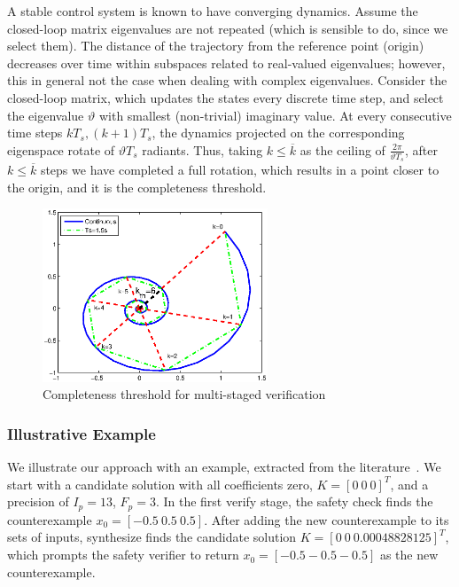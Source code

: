 \documentclass[runningheads,a4paper]{llncs}
\begin{document}
\begin{enumerate}
A stable control system is known to have converging dynamics.  Assume the
closed-loop matrix eigenvalues are not repeated (which is sensible to do,
since we select them).  The distance of the trajectory from the reference
point (origin) decreases over time within subspaces related to real-valued
eigenvalues; however, this in general not the case when dealing with complex
eigenvalues.  Consider the closed-loop matrix, which updates the states
every discrete time step, and select the eigenvalue $\vartheta$ with
smallest (non-trivial) imaginary value.  At every consecutive time steps
$kT_s, (k+1)T_s$, the dynamics projected on the corresponding eigenspace
rotate of $\vartheta T_s$ radiants.  Thus, taking $k{\leq}\overline{k}$ as the
ceiling of $\frac{2\pi}{\vartheta T_s}$, after $k{\leq}\overline{k}$ steps
we have completed a full rotation, which results in a point closer to the
origin, and it is the completeness threshold.

\begin{figure}[t]
\centering
\includegraphics[width=0.6\textwidth]{ct.eps}
\vspace{0.1cm}
\caption{Completeness threshold for multi-staged verification}
\label{fig:ct}
\end{figure}

\end{enumerate}

\subsubsection{Illustrative Example} \label{sec:running-ex}

We illustrate our approach with an example,
extracted from the literature~\cite{Franklin15}.
%
We start with a candidate solution with all coefficients zero, $K=[0
  \ 0 \ 0]^T$, and a precision of $I_p=13$, $F_p=3$.  In the first
{\sc verify} stage, the {\sc safety} check finds the counterexample
%
$ x_0 = [-0.5 \ 0.5 \ 0.5] $.
%
After adding the new counterexample to its sets of {\sc inputs}, {\sc
  synthesize} finds the candidate solution $K=[0 \ 0
  \ 0.00048828125]^T$, which prompts the {\sc safety} verifier to
return $x_0=[-0.5 -0.5 -0.5]$ as the new counterexample.
\end{document}
